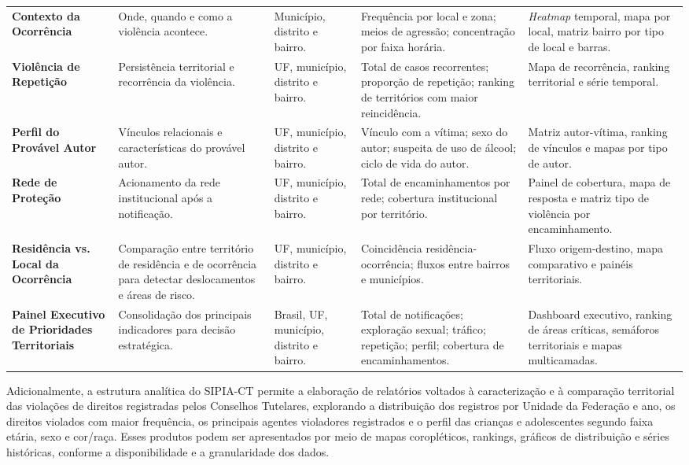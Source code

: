 \documentclass[11pt,a4paper]{article}
\begin{document}
\begin{longtable}{@{}P{2.8cm}P{3.3cm}P{2.3cm}P{3.3cm}P{3.0cm}@{}}
\textbf{Contexto da Ocorrência} & Onde, quando e como a violência acontece. & Município, distrito e bairro. & Frequência por local e zona; meios de agressão; concentração por faixa horária. & \emph{Heatmap} temporal, mapa por local, matriz bairro por tipo de local e barras. \\
\textbf{Violência de Repetição} & Persistência territorial e recorrência da violência. & UF, município, distrito e bairro. & Total de casos recorrentes; proporção de repetição; ranking de territórios com maior reincidência. & Mapa de recorrência, ranking territorial e série temporal. \\
\textbf{Perfil do Provável Autor} & Vínculos relacionais e características do provável autor. & UF, município, distrito e bairro. & Vínculo com a vítima; sexo do autor; suspeita de uso de álcool; ciclo de vida do autor. & Matriz autor-vítima, ranking de vínculos e mapas por tipo de autor. \\
\textbf{Rede de Proteção} & Acionamento da rede institucional após a notificação. & UF, município, distrito e bairro. & Total de encaminhamentos por rede; cobertura institucional por território. & Painel de cobertura, mapa de resposta e matriz tipo de violência por encaminhamento. \\
\textbf{Residência vs. Local da Ocorrência} & Comparação entre território de residência e de ocorrência para detectar deslocamentos e áreas de risco. & UF, município, distrito e bairro. & Coincidência residência-ocorrência; fluxos entre bairros e municípios. & Fluxo origem-destino, mapa comparativo e painéis territoriais. \\
\textbf{Painel Executivo de Prioridades Territoriais} & Consolidação dos principais indicadores para decisão estratégica. & Brasil, UF, município, distrito e bairro. & Total de notificações; exploração sexual; tráfico; repetição; perfil; cobertura de encaminhamentos. & Dashboard executivo, ranking de áreas críticas, semáforos territoriais e mapas multicamadas. \\
\end{longtable}
\endgroup

Adicionalmente, a estrutura analítica do SIPIA-CT permite a elaboração de relatórios voltados à caracterização e à comparação territorial das violações de direitos registradas pelos Conselhos Tutelares, explorando a distribuição dos registros por Unidade da Federação e ano, os direitos violados com maior frequência, os principais agentes violadores registrados e o perfil das crianças e adolescentes segundo faixa etária, sexo e cor/raça. Esses produtos podem ser apresentados por meio de mapas coropléticos, rankings, gráficos de distribuição e séries históricas, conforme a disponibilidade e a granularidade dos dados.
\end{document}
